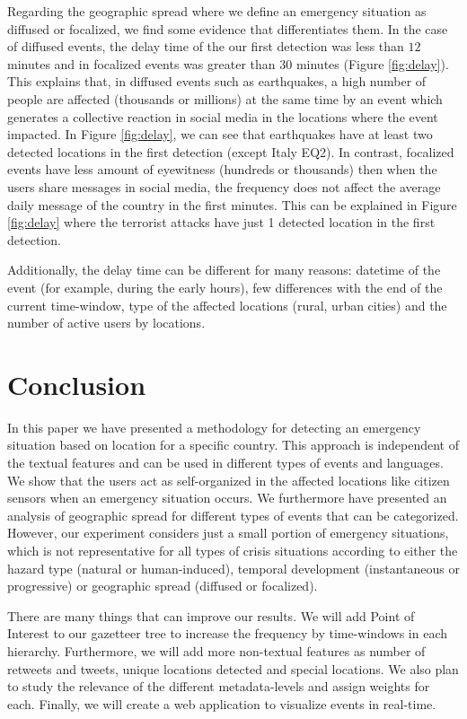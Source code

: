 \documentclass[sigconf]{acmart}
\begin{document}
Regarding the geographic spread where we define an emergency situation as diffused or focalized, we find some evidence that differentiates them. In the case of diffused events, the delay time of the our first detection was less than $12$ minutes and in focalized events was greater than $30$ minutes (Figure \ref{fig:delay}). This explains that, in diffused events such as earthquakes, a high number of people are affected (thousands or millions) at the same time by an event which generates a collective reaction in social media in the locations where the event impacted. In Figure \ref{fig:delay}, we can see that earthquakes have at least two detected locations in the first detection (except Italy EQ2). In contrast, focalized events have less amount of eyewitness (hundreds or thousands) then when the users share messages in social media, the frequency does not affect the average daily message of the country in the first minutes. This can be explained in Figure \ref{fig:delay} where the terrorist attacks have just 1 detected location in the first detection.

Additionally, the delay time can be different for many reasons: datetime of the event (for example, during the early hours), few differences with the end of the current time-window, type of the affected locations (rural, urban cities) and the number of active users by locations.



\section{Conclusion}

In this paper we have presented a methodology for detecting an emergency situation based on location for a specific country. This approach is independent of the textual features and can be used in different types of events and languages. We show that the users act as self-organized in the affected locations like citizen sensors when an emergency situation occurs. We furthermore have presented an analysis of geographic spread for different types of events that can be categorized. However, our experiment considers just a small portion of emergency situations, which is not representative for all types of crisis situations according to either the hazard type (natural or human-induced), temporal development (instantaneous or progressive) or geographic spread (diffused or focalized).

There are many things that can improve our results. We will add Point of Interest to our gazetteer tree to increase the frequency by time-windows in each hierarchy. Furthermore, we will add more non-textual features as number of retweets and tweets, unique locations detected and special locations. We also plan to study the relevance of the different metadata-levels and assign weights for each. Finally, we will create a web application to visualize events in real-time.

	




 
\end{document}
